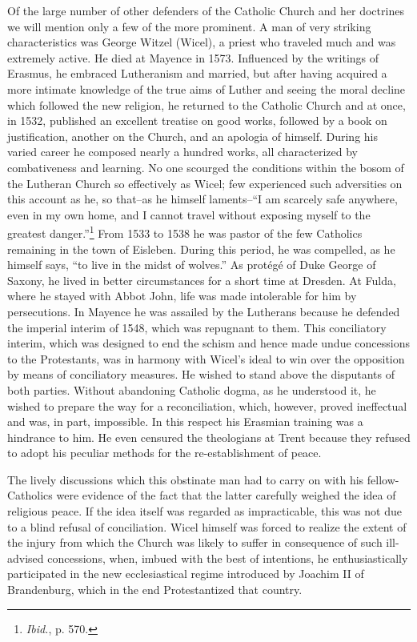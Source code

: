 Of the large number of other defenders of the Catholic Church
and her doctrines we will mention only a few of the more prominent.
A man of very striking characteristics was George Witzel (Wicel), a
priest who traveled much and was extremely active. He died at Mayence
in 1573. Influenced by the writings of Erasmus, he embraced
Lutheranism and married, but after having acquired a more intimate
knowledge of the true aims of Luther and seeing the moral decline
which followed the new religion, he returned to the Catholic Church
and at once, in 1532, published an excellent treatise on good works,
followed by a book on justification, another on the Church, and an
apologia of himself. During his varied career he composed nearly a
hundred works, all characterized by combativeness and learning. No
one scourged the conditions within the bosom of the Lutheran Church
so effectively as Wicel; few experienced such adversities on this
account as he, so that--as he himself laments--``I am scarcely safe
anywhere, even in my own home, and I cannot travel without exposing myself
to the greatest danger.''\footnote{\textit{Ibid.}, p. 570.}
 From 1533 to 1538 he was
pastor of the few Catholics remaining in the town of Eisleben. During
this period, he was compelled, as he himself says, “to live in the
midst of wolves.” As protégé of Duke George of Saxony, he lived in
better circumstances for a short time at Dresden. At Fulda, where he
stayed with Abbot John, life was made intolerable for him by persecutions.
In Mayence he was assailed by the Lutherans because he defended the imperial
interim of 1548, which was repugnant to them.
This conciliatory interim, which was designed to end the schism and
hence made undue concessions to the Protestants, was in harmony
with Wicel’s ideal to win over the opposition by means of conciliatory
measures. He wished to stand above the disputants of both parties. Without
abandoning Catholic dogma, as he understood it, he
wished to prepare the way for a reconciliation, which, however,
proved ineffectual and was, in part, impossible. In this respect his
Erasmian training was a hindrance to him. He even censured the
theologians at Trent because they refused to adopt his peculiar methods
for the re-establishment of peace.

The lively discussions which this obstinate man had to carry on
with his fellow-Catholics were evidence of the fact that the latter
carefully weighed the idea of religious peace. If the idea itself was
regarded as impracticable, this was not due to a blind refusal of
conciliation. Wicel himself was forced to realize the extent of the
injury from which the Church was likely to suffer in consequence of
such ill-advised concessions, when, imbued with the best of intentions,
he enthusiastically participated in the new ecclesiastical regime introduced
by Joachim II of Brandenburg, which in the end Protestantized that country.

